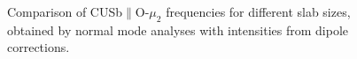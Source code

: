 \documentclass[11pt,DIV=13,BCOR=5mm,a4paper,headinclude]{scrbook}
\begin{document}
\begin{figure}[!h]
    \centering
             \quad
             \quad
             \caption{Comparison of CUSb$\parallel$O-$\mu_2$ frequencies for different slab sizes, obtained by normal mode analyses with intensities from dipole corrections.}
            \label{abb:Cb2_size_comp}
\end{figure}
\end{document}
